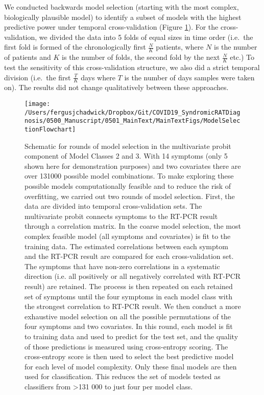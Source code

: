 \documentclass[]{elsarticle} %
\begin{document}
We conducted backwards model selection (starting with the most complex, biologically plausible model) to identify a subset of models with the highest predictive power under temporal cross-validation (Figure \ref{fig:modsel-flowchart2}).
For the cross-validation, we divided the data into 5 folds of equal sizes in time order (i.e.~the first fold is formed of the chronologically first \(\frac{N}{K}\) patients, where \(N\) is the number of patients and \(K\) is the number of folds, the second fold by the next \(\frac{N}{K}\) etc.)
To test the sensitivity of this cross-validation structure, we also did a strict temporal division (i.e.~the first \(\frac{T}{K}\) days where \(T\) is the number of days samples were taken on).
The results did not change qualitatively between these approaches.

\begin{figure}
\texttt{[image: /Users/fergusjchadwick/Dropbox/Git/COVID19\_SyndromicRATDiagnosis/0500\_Manuscript/0501\_MainText/MainTextFigs/ModelSelectionFlowchart]} \caption{Schematic for rounds of model selection in the multivariate probit component of Model Classes 2 and 3. With 14 symptoms (only 5 shown here for demonstration purposes) and two covariates there are over 131000 possible model combinations. To make exploring these possible models computationally feasible and to reduce the risk of overfitting, we carried out two rounds of model selection. First, the data are divided into temporal cross-validation sets. The multivariate probit connects symptoms to the RT-PCR result through a correlation matrix. In the coarse model selection, the most complex feasible model (all symptoms and covariates) is fit to the training data. The estimated correlations between each symptom and the RT-PCR result are compared for each cross-validation set. The symptoms that have non-zero correlations in a systematic direction (i.e. all positively or all negatively correlated with RT-PCR result) are retained. The process is then repeated on each retained set of symptoms until the four symptoms in each model class with the strongest correlation to RT-PCR result. We then conduct a more exhaustive model selection on all the possible permutations of the four symptoms and two covariates. In this round, each model is fit to training data and used to predict for the test set, and the quality of those predictions is measured using cross-entropy scoring. The cross-entropy score is then used to select the best predictive model for each level of model complexity. Only these final models are then used for classification. This reduces the set of models tested as classifiers from >131 000 to just four per model class.}\label{fig:modsel-flowchart2}
\end{figure}
\end{document}

